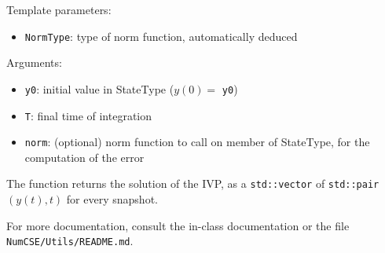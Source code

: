 \begin{enumerate}
    Template parameters:
    \begin{itemize}
        \item \texttt{NormType}: type of norm function, automatically deduced
    \end{itemize}

    Arguments:
    \begin{itemize}
        \item \texttt{y0}:         initial value in StateType ($y(0) =$ \texttt{y0})
        \item \texttt{T}:          final time of integration
        \item \texttt{norm}:       (optional) norm function to call on member of StateType, for the computation of the error
    \end{itemize}

    The function returns the solution of the IVP, as a \texttt{std::vector} 
    of \texttt{std::pair} $(y(t), t)$ for every snapshot.
\end{enumerate}

For more documentation, consult the in-class documentation or the file \texttt{NumCSE/Utils/README.md}.
